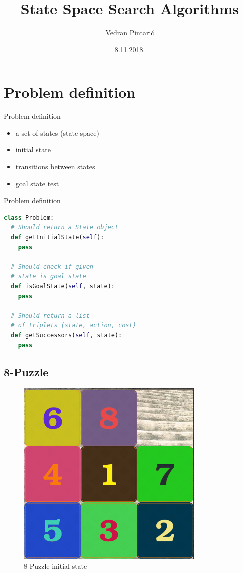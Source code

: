 \documentclass{beamer}
\title[State Space Search Algorithms]{State Space Search Algorithms}
\author{Vedran Pintarić}
\date{8.11.2018.}
\begin{document}
\begin{frame}
  \titlepage
\end{frame}

\section{Problem definition}

\begin{frame}{Problem definition}

	\begin{itemize}
		\item a set of states (state space)
		\item initial state
		\item transitions between states
		\item goal state test
	\end{itemize}

\end{frame}

\begin{frame}[fragile]{Problem definition}

	\begin{lstlisting}[language=Python]
class Problem:
  # Should return a State object
  def getInitialState(self):
    pass

  # Should check if given
  # state is goal state
  def isGoalState(self, state):
    pass

  # Should return a list
  # of triplets (state, action, cost)
  def getSuccessors(self, state):
    pass
	\end{lstlisting}

\end{frame}

\subsection{8-Puzzle}

\begin{frame}
	\begin{figure}
	\centering
		\includegraphics[width=0.5\linewidth]{puzzle8.png}
		\caption{8-Puzzle initial state}
	\end{figure}
\end{frame}
\end{document}
